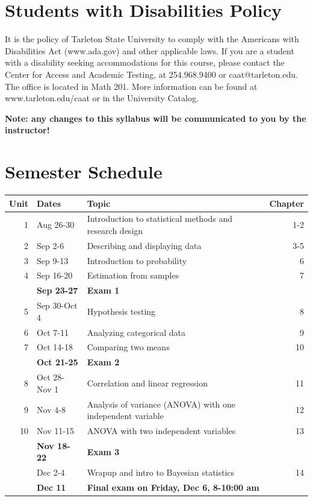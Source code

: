 \documentclass[10pt]{article}
\begin{document}
\section*{Students with Disabilities Policy}
\label{sec:org4ab4c73}

It is the policy of Tarleton State University to comply with the Americans with Disabilities  Act (www.ada.gov) and other applicable laws.  If you are a student with a disability seeking accommodations for this course, please contact the Center for Access and Academic Testing, at 254.968.9400 or caat@tarleton.edu. The office is located in Math 201. More information can be found at www.tarleton.edu/caat or in the University Catalog.​

\textbf{Note:  any changes to this syllabus will be communicated to you by the instructor!}

\section*{Semester Schedule}
\label{sec:orgc0f51bd}
\begin{center}
\begin{tabular}{rllr}
Unit & Dates & Topic & Chapter\\
\hline
1 & Aug 26-30 & Introduction to statistical methods and research design & 1-2\\
2 & Sep 2-6 & Describing and displaying data & 3-5\\
3 & Sep 9-13 & Introduction to probability & 6\\
4 & Sep 16-20 & Estimation from samples & 7\\
 & \textbf{Sep 23-27} & \textbf{Exam 1} & \\
5 & Sep 30-Oct 4 & Hypothesis testing & 8\\
6 & Oct 7-11 & Analyzing categorical data & 9\\
7 & Oct 14-18 & Comparing two means & 10\\
 & \textbf{Oct 21-25} & \textbf{Exam 2} & \\
8 & Oct 28-Nov 1 & Correlation and linear regression & 11\\
9 & Nov 4-8 & Analysis of variance (ANOVA) with one independent variable & 12\\
10 & Nov 11-15 & ANOVA with two independent variables & 13\\
 & \textbf{Nov 18-22} & \textbf{Exam 3} & \\
 & Dec 2-4 & Wrapup and intro to Bayesian statistics & 14\\
 & \textbf{Dec 11} & \textbf{Final exam on Friday, Dec 6, 8-10:00 am} & \\
\end{tabular}
\end{center}
\end{document}
